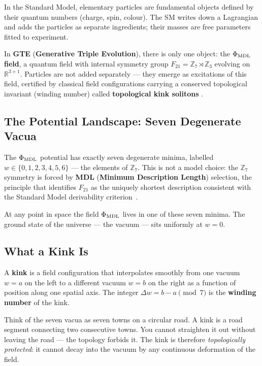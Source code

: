 \documentclass[11pt,a4paper]{article}
\newcommand{\term}[1]{\textbf{#1}}
\begin{document}
In the Standard Model, elementary particles are fundamental objects defined by
their quantum numbers (charge, spin, colour).  The SM writes down a Lagrangian
and adds the particles as separate ingredients; their masses are free parameters
fitted to experiment.

In \term{GTE} (\term{Generative Triple Evolution}), there is only one object:
the \term{$\Phi_{\rm MDL}$ field}, a quantum field with internal symmetry group
$F_{21} = \mathbb{Z}_7 \rtimes \mathbb{Z}_3$ evolving on $\mathbb{R}^{3+1}$.
Particles are not added separately — they emerge as excitations of this field,
certified by classical field configurations carrying a conserved topological
invariant (winding number) called \term{topological kink solitons}
\cite{SpivackGTECompleteFramework}.

\subsection{The Potential Landscape: Seven Degenerate Vacua}

The $\Phi_{\rm MDL}$ potential has exactly seven degenerate minima, labelled
$w \in \{0,1,2,3,4,5,6\}$ — the elements of $\mathbb{Z}_7$.  This is not
a model choice: the $\mathbb{Z}_7$ symmetry is forced by
\term{MDL} (\term{Minimum Description Length}) selection, the principle that
identifies $F_{21}$ as the uniquely shortest description consistent with the
Standard Model derivability criterion~\cite{SpivackGTECompleteFramework}.

At any point in space the field $\Phi_{\rm MDL}$ lives in one of these seven
minima.  The ground state of the universe — the vacuum — sits uniformly at
$w = 0$.

\subsection{What a Kink Is}

\begin{tcolorbox}[colback=boxorange,colframe=orange!60!black,
  title=Definition: Topological Kink (BPS Soliton)]
A \term{kink} is a field configuration that interpolates smoothly from one
vacuum $w = a$ on the left to a different vacuum $w = b$ on the right as a
function of position along one spatial axis.  The integer
$\Delta w = b - a \pmod{7}$
is the \term{winding number} of the kink.
\end{tcolorbox}

Think of the seven vacua as seven towns on a circular road.  A kink is a road
segment connecting two consecutive towns.  You cannot straighten it out without
leaving the road — the topology forbids it.  The kink is therefore
\emph{topologically protected}: it cannot decay into the vacuum by any
continuous deformation of the field.
\end{document}

